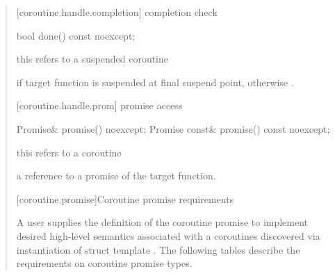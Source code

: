 \begin{quote}
[coroutine.handle.completion]{ completion check}
\begin{itemdecl}
  bool done() const noexcept; 
\end{itemdecl}
\begin{itemdescr}
  \pnum
  \precondition *this refers to a suspended coroutine
  
  \pnum
  \returns {} if target function is suspended
  at final suspend point, otherwise .
\end{itemdescr}

[coroutine.handle.prom]{ promise access}
\begin{itemdecl}
  Promise& promise() noexcept;		
  Promise const& promise() const noexcept;
\end{itemdecl}

\begin{itemdescr}
  \pnum
  \precondition *this refers to a coroutine
  
  \pnum
  \returns a reference to a promise of the target function.
\end{itemdescr}


[coroutine.promise]{Coroutine promise requirements}

\pnum
A user supplies the definition of the coroutine promise to implement 
desired high-level semantics associated with a coroutines
discovered via instantiation of struct template .
The following tables describe the requirements on
coroutine promise types.



\end{quote}
